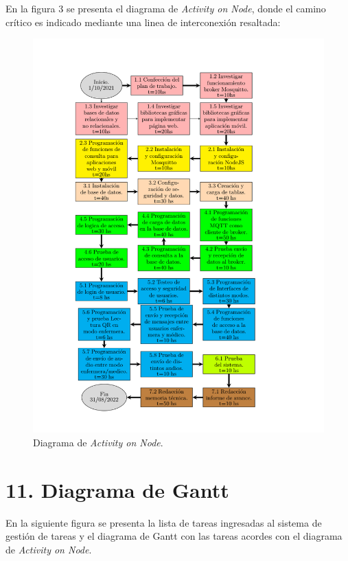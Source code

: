 \documentclass[
11pt, %
]{charter}
\begin{document}
En la figura 3 se presenta el diagrama de \textit{Activity on Node}, donde el camino crítico es indicado mediante una linea de interconexión resaltada:
\begin{figure}[htpb]
\centering 
\includegraphics[width=1\textwidth]{./Figuras/diagramaAoN.png}
\caption{Diagrama de \textit{Activity on Node}.}
\label{fig:AoN}
\end{figure}


\section{11. Diagrama de Gantt}
\label{sec:gantt}
En la siguiente figura se presenta la lista de tareas ingresadas al sistema de gestión de tareas y el diagrama de Gantt con las tareas acordes con el diagrama de \textit{Activity on Node}.
\end{document}
